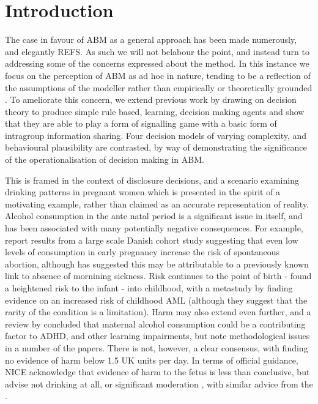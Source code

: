 \section{Introduction}
\label{sec:intro}

The case in favour of \ac{ABM} as a general approach has been made numerously, and elegantly REFS. As such we will not belabour the point, and instead turn to addressing some of the concerns expressed about the method. In this instance we focus on the perception of \ac{ABM} as ad hoc in nature, tending to be a reflection of the assumptions of the modeller rather than empirically or theoretically grounded \citep{Waldherr2013}. To ameliorate this concern, we extend previous work by \cite{GrayDissert} drawing on decision theory to produce simple rule based, learning, decision making agents and show that they are able to play a form of signalling game \citep{Kreps1987} with a basic form of intragroup information sharing. Four decision models of varying complexity, and behavioural plausibility are contrasted, by way of demonstrating the significance of the operationalisation of decision making in \ac{ABM}.

This is framed in the context of disclosure decisions, and a scenario examining drinking patterns in pregnant women which is presented in the spirit of a motivating example, rather than claimed as an accurate representation of reality. Alcohol consumption in the ante natal period is a significant issue in itself, and has been associated with many potentially negative consequences. For example, \citet{Andersen2012} report results from a large scale Danish cohort study suggesting that even low levels of consumption in early pregnancy increase the risk of spontaneous abortion, although \citet{Savitz2012} has suggested this may be attributable to a previously known link to absence of mornining sickness. Risk continues to the point of birth - \citet{Kesmodel2002} found a heightened risk to the infant - into childhood, with a metastudy by \citet{Latino-Martel2010} finding evidence on an increased risk of childhood \ac{AML} (although they suggest that the rarity of the condition is a limitation). Harm may also extend even further, and a review by \citet{Huizink2006} concluded that maternal alcohol consumption could be a contributing factor to \ac{ADHD}, and other learning impairments, but note methodological issues in a number of the papers. There is not, however, a clear consensus, with \citet{Gray2006} finding no evidence of harm below 1.5 UK units per day. In terms of official guidance, \ac{NICE} acknowledge that evidence of harm to the fetus is less than conclusive, but advise not drinking at all, or significant moderation \citep{NICE2010a}, with similar advice from the \cite{DepartmentofHealth2008}.

